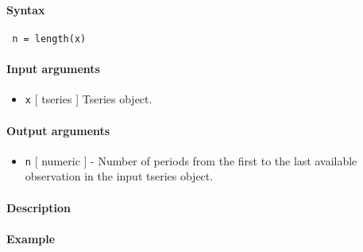 


	\paragraph{Syntax}
 
 \begin{verbatim}
 n = length(x)
 \end{verbatim}
 
 \paragraph{Input arguments}
 
 \begin{itemize}
 \item
   \texttt{x} {[} tseries {]} Tseries object.
 \end{itemize}
 
 \paragraph{Output arguments}
 
 \begin{itemize}
 \item
   \texttt{n} {[} numeric {]} - Number of periods from the first to the
   last available observation in the input tseries object.
 \end{itemize}
 
 \paragraph{Description}
 
 \paragraph{Example}


